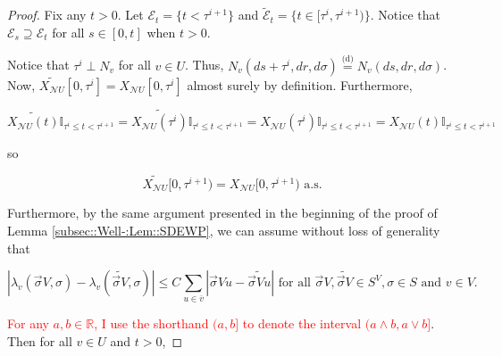 \documentclass[12pt]{article}
\newcommand{\mb}{\mathbb}
\newcommand{\mc}{\mathcal}
\newcommand{\ov}{\overline}
\newcommand{\te}{\text}
\newcommand{\tr}{\textcolor{red}}
\newcommand{\ind}{\hspace{24pt}}
\newcommand{\deq}{\overset{\text{(d)}}{=}}			%
\newcommand{\neigh}{\mc{N}}					%
\renewcommand{\v}{v}							%
\newcommand{\vv}{u}								%
\renewcommand{\U}{U}							%
\renewcommand{\S}{S}							%
\newcommand{\s}{\sigma}							%
\newcommand{\sv}{\vec{\s}}						%
\renewcommand{\t}{t}							%
\renewcommand{\tt}{s}							%
\newcommand{\cl}{\ov}							%
\newcommand{\poiss}[1]{N_{#1}}						%
\newcommand{\V}{V}									%
\newcommand{\rt}[1]{\tau^{#1}}						%
\newcommand{\itt}{i}								%
\newcommand{\XState}[1]{\S^{#1}}				%
\newcommand{\rxvt}[2]{X_{#1}{(#2)}}					%
\newcommand{\rxvts}[2]{X_{#1}{#2}}					%
\newcommand{\rate}[1]{\lambda_{#1}}					%
\newcommand{\const}[1]{C_{#1}}						%
\newcommand{\alt}{\widetilde}						%
\newcommand{\evnt}{\mc{E}}						%
\begin{document}
\begin{proof}
\ind Fix any \(\t > 0\). Let \(\evnt_\t = \{\t < \rt{\itt+1}\}\) and \(\alt{\evnt}_\t = \{\t\in [\rt{\itt},\rt{\itt+1})\}\). Notice that \(\evnt_\tt \supseteq \evnt_\t\) for all \(\tt\in [0,\t]\) when \(\t > 0\). 

\ind Notice that \(\rt{\itt} \perp \poiss{\v}\) for all \(\v \in \U\). Thus, \(\poiss{\v}(d\tt+\rt{\itt},dr,d\s) \deq \poiss{\v}(d\tt,dr,d\s)\). Now, \(\alt{\rxvts{\neigh{\U}}{}}[0,\rt{\itt}] = \rxvts{\neigh{\U}}{[0,\rt{\itt}]}\) almost surely by definition. Furthermore,

\[\alt{\rxvt{\neigh{\U}}{\t}}\mb{I}_{\rt{\itt}\leq \t < \rt{\itt+1}} = \alt{\rxvt{\neigh{\U}}{\rt{\itt}}}\mb{I}_{\rt{\itt}\leq \t < \rt{\itt+1}} = \rxvt{\neigh{\U}}{\rt{\itt}}\mb{I}_{\rt{\itt}\leq \t < \rt{\itt+1}} = \rxvt{\neigh{\U}}{\t}\mb{I}_{\rt{\itt}\leq \t < \rt{\itt+1}}\]

so

\[\alt{\rxvts{\neigh{\U}}{}}[0,\rt{\itt+1}) = \rxvts{\neigh{\U}}{[0,\rt{\itt+1})} \te{ a.s.}\]

Furthermore, by the same argument presented in the beginning of the proof of Lemma \ref{subsec::Well-:Lem::SDEWP}, we can assume without loss of generality that 

\[|\rate{\v}(\sv{\V}{},\s) - \rate{\v}(\alt{\sv{\V}{}},\s)| \leq \const{}\sum_{\vv\in \cl{\v}} |\sv{\V}{\vv} - \alt{\sv{\V}{\vv}}|\te{ for all } \sv{\V}{},\alt{\sv{\V}{}}\in \S^\V,\s \in \S \te{ and } \v \in \V.\]

\tr{For any \(a,b\in \mb{R}\), I use the shorthand \((a,b]\) to denote the interval \((a\wedge b,a\vee b]\)}. Then for all \(v\in \U\) and \(\t > 0\),


\end{proof}
\end{document}
